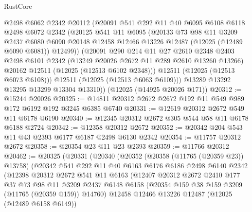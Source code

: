 \begin{lexlean}{RustCore}
\begin{coremodule}
          @2498
          @6062
          @2342
          @20112
          (@20091
            @541
            @292
            @11
            @40
            @6095
            @6108
            @6118
            @2498
            @6072
            @2342
            (@20125
              @541
              @11
              @6095
              (@20133
                @73
                @98
                @11
                @3209
                @2437
                @6080
                @6090
                @20148
                @12458
                @12466
                @13226
                @12487
                (@12025 (@12489 @6090 @6081))
                @12499))
            (@20091
              @290
              @214
              @11
              @27
              @2610
              @2348
              @2403
              @2498
              @6101
              @2342
              (@13249 @20026 @2672 @11 @289 @2610 @13260 @13266)
              @20162
              @12511
              (@12025 (@12513 @6102 @2348)))
            @12511
            (@12025 (@12513 @6073 @6108)))
          @12511
          (@12025 (@12513 @6063 @6109)))
        @13289
        @13292
        @13295
        @13299
        @13304
        @13310))
    (@12025 (@14925 @20026 @171))
@20312 := @15244 @20026
@20325 := @14811 @20312 @2672 @2672 @192 @11 @549 @989 @172 @6192 @192 @3245 @6385 @6740
@20331 := @12619 @20312 @2672 @549 @11 @6178 @6190
@20340 := @12345 @20312 @2672 @305 @544 @58 @11 @6178 @6188 @2724
@20342 := @12358 @20312 @2672
@20352 := @20342 @204 @543 @11 @43 @2393 @6177 @6187 @2498 @6130 @2342
@20354 := @11757 @20312 @2672
@20358 := @20354 @23 @11 @23 @2393
@20359 := @11766 @20312
@20462 := @20325
    (@20331
      (@20340
        (@20352
          (@20358 (@11765 (@20359 @23)) @13758)
          (@20342
            @541
            @292
            @11
            @40
            @6163
            @6176
            @6186
            @2498
            @6140
            @2342
            (@12398
              @20312
              @2672
              @541
              @11
              @6163
              (@12407
                @20312
                @2672
                @2410
                @177
                @37
                @73
                @98
                @11
                @3209
                @2437
                @6148
                @6158
                (@20354 @159 @38 @159 @3209 (@11765 (@20359 @159)) @14760)
                @12458
                @12466
                @13226
                @12487
                (@12025 (@12489 @6158 @6149))

\end{coremodule}
\end{lexlean}
